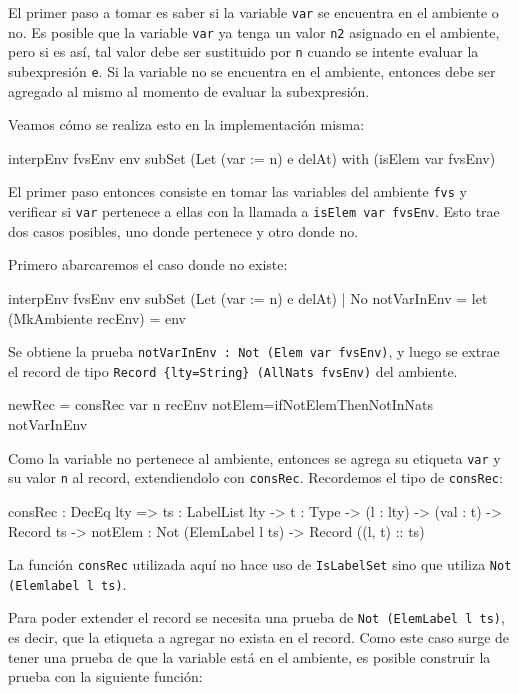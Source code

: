 El primer paso a tomar es saber si la variable \texttt{var} se encuentra en el ambiente o no. Es posible que la variable \texttt{var} ya tenga un valor \texttt{n2} asignado en el ambiente, pero si es así, tal valor debe ser sustituido por \texttt{n} cuando se intente evaluar la subexpresión \texttt{e}. Si la variable no se encuentra en el ambiente, entonces debe ser agregado al mismo al momento de evaluar la subexpresión.

Veamos cómo se realiza esto en la implementación misma:

\begin{code}
interpEnv {fvsEnv} env subSet (Let (var := n) e delAt)
    with (isElem var fvsEnv)
\end{code}

El primer paso entonces consiste en tomar las variables del ambiente \texttt{fvs} y verificar si \texttt{var} pertenece a ellas con la llamada a \texttt{isElem var fvsEnv}. Esto trae dos casos posibles, uno donde pertenece y otro donde no.

Primero abarcaremos el caso donde no existe:

\begin{code}
interpEnv {fvsEnv} env subSet (Let (var := n) e delAt)
  | No notVarInEnv =
  let (MkAmbiente recEnv) = env
\end{code}

Se obtiene la prueba \texttt{notVarInEnv : Not (Elem var fvsEnv)}, y luego se extrae el record de tipo \texttt{Record \{lty=String\} (AllNats fvsEnv)} del ambiente.

\begin{code}
newRec = consRec var n recEnv
  {notElem=ifNotElemThenNotInNats notVarInEnv}
\end{code}

Como la variable no pertenece al ambiente, entonces se agrega su etiqueta \texttt{var} y su valor \texttt{n} al record, extendiendolo con \texttt{consRec}. Recordemos el tipo de \texttt{consRec}:

\begin{code}
consRec : DecEq lty => {ts : LabelList lty} -> {t : Type} ->
  (l : lty) -> (val : t) -> Record ts ->
  {notElem : Not (ElemLabel l ts)} -> Record ((l, t) :: ts)
\end{code}

La función \texttt{consRec} utilizada aquí no hace uso de \texttt{IsLabelSet} sino que utiliza \texttt{Not (Elemlabel l ts)}.

Para poder extender el record se necesita una prueba de \texttt{Not (ElemLabel l ts)}, es decir, que la etiqueta a agregar no exista en el record. Como este caso surge de tener una prueba de que la variable está en el ambiente, es posible construir la prueba con la siguiente función:

